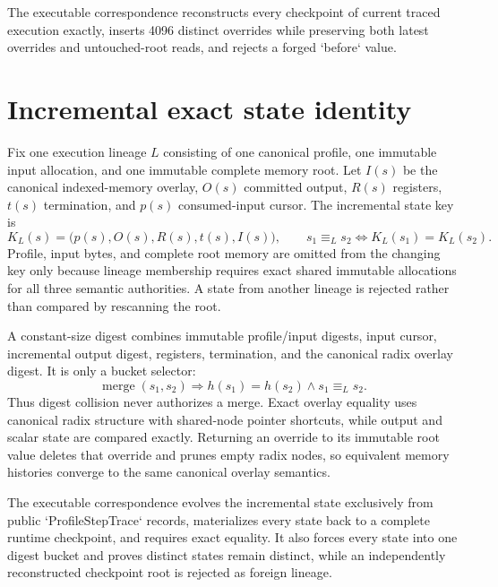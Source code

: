 \documentclass{article}
\begin{document}
The executable correspondence reconstructs every checkpoint of current traced
execution exactly, inserts 4096 distinct overrides while preserving both latest
overrides and untouched-root reads, and rejects a forged `before` value.

\section{Incremental exact state identity}

Fix one execution lineage $L$ consisting of one canonical profile, one immutable
input allocation, and one immutable complete memory root. Let $I(s)$ be the
canonical indexed-memory overlay, $O(s)$ committed output, $R(s)$ registers,
$t(s)$ termination, and $p(s)$ consumed-input cursor. The incremental state key
is
\begin{equation}
  K_L(s)=\bigl(p(s),O(s),R(s),t(s),I(s)\bigr),
  \qquad
  s_1\equiv_L s_2 \Longleftrightarrow K_L(s_1)=K_L(s_2).
  \label{eq:state-graph-incremental-identity}
\end{equation}
Profile, input bytes, and complete root memory are omitted from the changing key
only because lineage membership requires exact shared immutable allocations for
all three semantic authorities. A state from another lineage is rejected rather
than compared by rescanning the root.

A constant-size digest combines immutable profile/input digests, input cursor,
incremental output digest, registers, termination, and the canonical radix
overlay digest. It is only a bucket selector:
\begin{equation}
  \operatorname{merge}(s_1,s_2)
  \Longrightarrow
  h(s_1)=h(s_2)\land s_1\equiv_L s_2.
  \label{eq:state-graph-incremental-collision-guard}
\end{equation}
Thus digest collision never authorizes a merge. Exact overlay equality uses
canonical radix structure with shared-node pointer shortcuts, while output and
scalar state are compared exactly. Returning an override to its immutable root
value deletes that override and prunes empty radix nodes, so equivalent memory
histories converge to the same canonical overlay semantics.

The executable correspondence evolves the incremental state exclusively from
public `ProfileStepTrace` records, materializes every state back to a complete
runtime checkpoint, and requires exact equality. It also forces every state into
one digest bucket and proves distinct states remain distinct, while an
independently reconstructed checkpoint root is rejected as foreign lineage.
\end{document}
